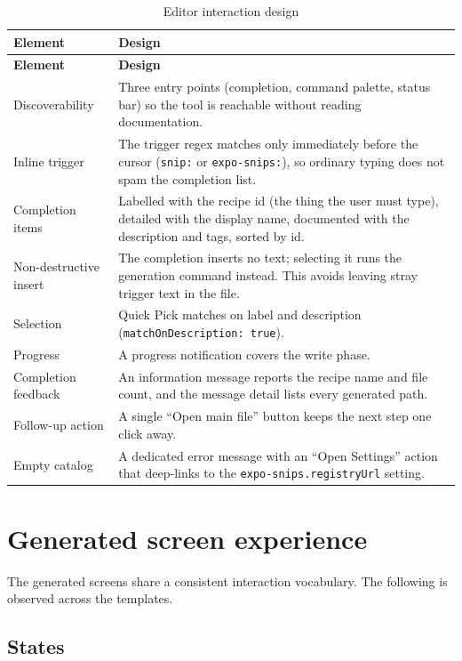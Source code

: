 \begin{longtable}{@{}L{4cm}L{10.2cm}@{}}
\caption{Editor interaction design}\\
\toprule
\textbf{Element} & \textbf{Design} \\
\midrule
\endfirsthead
\toprule
\textbf{Element} & \textbf{Design} \\
\midrule
\endhead
Discoverability & Three entry points (completion, command palette, status bar) so the
tool is reachable without reading documentation. \\
Inline trigger & The trigger regex matches only immediately before the cursor
(\texttt{snip:} or \texttt{expo-snips:}), so ordinary typing does not spam the
completion list. \\
Completion items & Labelled with the recipe id (the thing the user must type),
detailed with the display name, documented with the description and tags, sorted by
id. \\
Non-destructive insert & The completion inserts no text; selecting it runs the
generation command instead. This avoids leaving stray trigger text in the file. \\
Selection & Quick Pick matches on label and description
(\texttt{matchOnDescription: true}). \\
Progress & A progress notification covers the write phase. \\
Completion feedback & An information message reports the recipe name and file count,
and the message detail lists every generated path. \\
Follow-up action & A single ``Open main file'' button keeps the next step one click
away. \\
Empty catalog & A dedicated error message with an ``Open Settings'' action that
deep-links to the \texttt{expo-snips.registryUrl} setting. \\
\bottomrule
\end{longtable}

\section{Generated screen experience}

The generated screens share a consistent interaction vocabulary. The following is
observed across the templates.

\subsection*{States}

